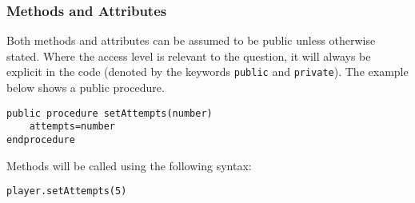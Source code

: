 \documentclass[a4paper,11pt]{article}
\begin{document}
\subsubsection{Methods and Attributes}
Both methods and attributes can be assumed to be public unless otherwise stated. Where the access level is relevant to the question, it will always be explicit in the code (denoted by the keywords \verb|public| and \verb|private|). The example below shows a public procedure.
\begin{Verbatim}[breaklines=true, breakanywhere=true]
public procedure setAttempts(number)
    attempts=number
endprocedure
\end{Verbatim}
Methods will be called using the following syntax:
\begin{Verbatim}[breaklines=true, breakanywhere=true]
player.setAttempts(5)
\end{Verbatim}
\end{document}
